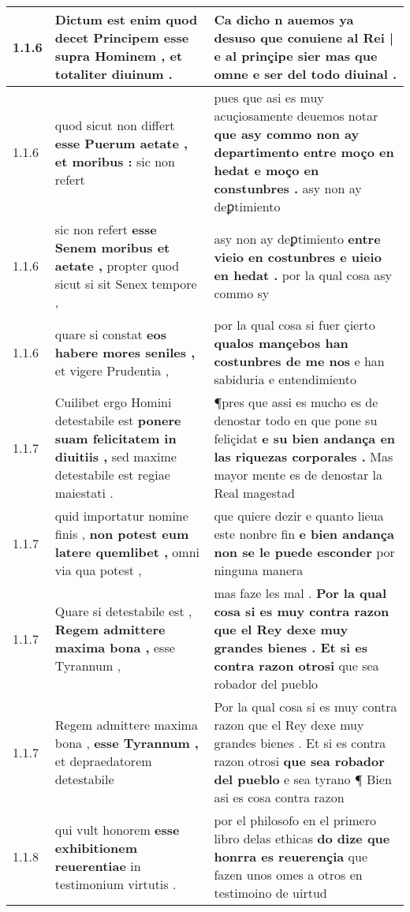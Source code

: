 \begin{tabular}{|p{1cm}|p{6.5cm}|p{6.5cm}|}
1.1.6 & Dictum est enim \textbf{ quod decet Principem esse supra Hominem , } et totaliter diuinum . & Ca dicho n auemos ya desuso \textbf{ que conuiene al Rei | e al prinçipe sier } mas que omne e ser del todo diuinal . \\\hline
1.1.6 & quod sicut non differt \textbf{ esse Puerum aetate , et moribus : } sic non refert & pues que asi es muy acuçiosamente deuemos notar \textbf{ que asy commo non ay departimento entre moço en hedat e moço en constunbres . } asy non ay deꝑtimiento \\\hline
1.1.6 & sic non refert \textbf{ esse Senem moribus et aetate , } propter quod sicut si sit Senex tempore , & asy non ay deꝑtimiento \textbf{ entre vieio en costunbres e uieio en hedat . } por la qual cosa asy commo sy \\\hline
1.1.6 & quare si constat \textbf{ eos habere mores seniles , } et vigere Prudentia , & por la qual cosa si fuer çierto \textbf{ qualos mançebos han costunbres de me nos } e han sabiduria e entendimiento \\\hline
1.1.7 & Cuilibet ergo Homini detestabile est \textbf{ ponere suam felicitatem in diuitiis , } sed maxime detestabile est regiae maiestati . & ¶pres que assi es mucho es de denostar todo en que pone su feliçidat \textbf{ e su bien andança en las riquezas corporales . } Mas mayor mente es de denostar la Real magestad \\\hline
1.1.7 & quid importatur nomine finis , \textbf{ non potest eum latere quemlibet , } omni via qua potest , & que quiere dezir e quanto lieua este nonbre fin \textbf{ e bien andança non se le puede esconder } por ninguna manera \\\hline
1.1.7 & Quare si detestabile est , \textbf{ Regem admittere maxima bona , } esse Tyrannum , & mas faze les mal . \textbf{ Por la qual cosa si es muy contra razon que el Rey dexe muy grandes bienes . Et si es contra razon otrosi } que sea robador del pueblo \\\hline
1.1.7 & Regem admittere maxima bona , \textbf{ esse Tyrannum , } et depraedatorem detestabile & Por la qual cosa si es muy contra razon que el Rey dexe muy grandes bienes . Et si es contra razon otrosi \textbf{ que sea robador del pueblo } e sea tyrano ¶ Bien asi es cosa contra razon \\\hline
1.1.8 & qui vult honorem \textbf{ esse exhibitionem reuerentiae } in testimonium virtutis . & por el philosofo en el primero libro delas ethicas \textbf{ do dize que honrra es reuerençia } que fazen unos omes a otros en testimoino de uirtud \\\hline

\end{tabular}
